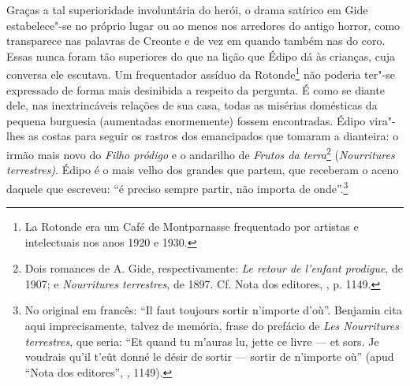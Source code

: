 Graças a tal superioridade involuntária do herói, o drama satírico em
Gide estabelece"-se no próprio lugar ou ao menos nos arredores do antigo
horror, como transparece nas palavras de Creonte e de vez em quando
também nas do coro. Essas nunca foram tão superiores do que na lição que
Édipo dá às crianças, cuja conversa ele escutava. Um frequentador
assíduo da Rotonde\footnote{La Rotonde era um Café de Montparnasse
  frequentado por artistas e intelectuais nos anos 1920 e 1930. \versal{[N. E.]}} não
poderia ter"-se expressado de forma mais desinibida a respeito da
pergunta. É como se diante dele, nas inextrincáveis relações de sua
casa, todas as misérias domésticas da pequena burguesia (aumentadas
enormemente) fossem encontradas. Édipo vira"-lhes as costas para seguir
os rastros dos emancipados que tomaram a dianteira: o irmão mais novo do
\emph{Filho pródigo} e o andarilho de \emph{Frutos da terra}\footnote{Dois romances de A. Gide, respectivamente: \emph{Le retour de l'enfant
  prodigue}, de 1907; e \emph{Nourritures terrestres}, de 1897. Cf. Nota
  dos editores, , p. 1149. \versal{[N. E.]}} (\emph{Nourritures terrestres)}. Édipo é o
mais velho dos grandes que partem, que receberam o aceno daquele que
escreveu: ``é preciso sempre partir, não importa de onde''.\footnote{No original em francês: ``Il faut toujours sortir n'importe d'où''.
  Benjamin cita aqui imprecisamente, talvez de memória, frase do
  prefácio de \emph{Les Nourritures terrestres}, que seria: ``Et quand
  tu m'auras lu, jette ce livre --- et sors. Je voudrais qu'il t'eût
  donné le désir de sortir --- sortir de n'importe où'' (apud ``Nota dos
  editores'', , 1149). \versal{[N. T.]}}
